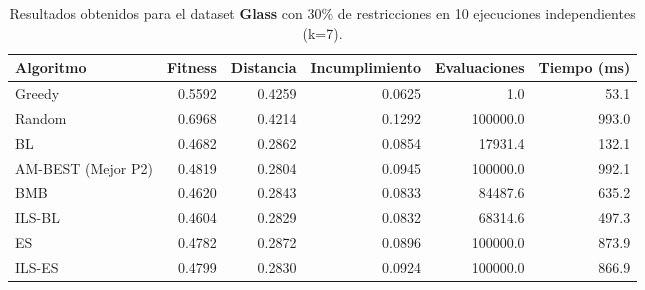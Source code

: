 \begin{table}[H]
    \centering
    \begin{tabular}{lrrrrr}
        \hline
        Algoritmo & Fitness & Distancia & Incumplimiento & Evaluaciones & Tiempo (ms)\\
        \hline
        Greedy & 0.5592 & 0.4259 & 0.0625 & 1.0 & 53.1 \\
        Random & 0.6968 & 0.4214 & 0.1292 & 100000.0 & 993.0 \\
        BL & 0.4682 & 0.2862 & 0.0854 & 17931.4 & 132.1 \\
        AM-BEST (Mejor P2) & 0.4819 & 0.2804 & 0.0945 & 100000.0 & 992.1 \\
        BMB & 0.4620 & 0.2843 & 0.0833 & 84487.6 & 635.2 \\
        ILS-BL & 0.4604 & 0.2829 & 0.0832 & 68314.6 & 497.3 \\
        ES & 0.4782 & 0.2872 & 0.0896 & 100000.0 & 873.9 \\
        ILS-ES & 0.4799 & 0.2830 & 0.0924 & 100000.0 & 866.9 \\
        \hline
    \end{tabular}
    \caption{Resultados obtenidos para el dataset \textbf{Glass} con 30\% de restricciones en  10 ejecuciones independientes (k=7).}
    \label{tab:res_glass_30}
\end{table}